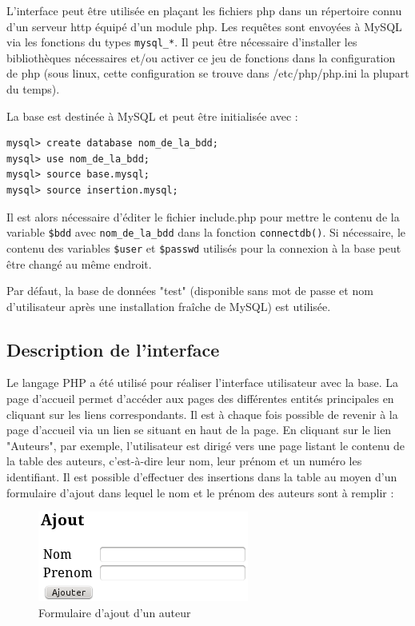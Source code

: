 \documentclass[12pt]{article}
\begin{document}
L'interface peut être utilisée en plaçant les fichiers php dans un répertoire
connu d'un serveur http équipé d'un module php. Les requêtes sont envoyées à
MySQL via les fonctions du types \verb!mysql_*!. Il peut être nécessaire
d'installer les bibliothèques nécessaires et/ou activer ce jeu de fonctions
dans la configuration de php (sous linux, cette configuration se trouve dans
/etc/php/php.ini la plupart du temps).

La base est destinée à MySQL et peut être initialisée avec :
\begin{verbatim}
mysql> create database nom_de_la_bdd;
mysql> use nom_de_la_bdd;
mysql> source base.mysql;
mysql> source insertion.mysql;
\end{verbatim}

Il est alors nécessaire d'éditer le fichier include.php pour mettre le contenu
de la variable \verb!$bdd! avec \verb!nom_de_la_bdd! dans la fonction
\verb!connectdb()!. Si nécessaire, le contenu des variables \verb!$user! et
\verb!$passwd! utilisés pour la connexion à la base peut être changé au même
endroit.

Par défaut, la base de données "test" (disponible sans mot de passe et nom
d'utilisateur après une installation fraîche de MySQL) est utilisée.


\subsection{Description de l'interface}

Le langage PHP a été utilisé pour réaliser l'interface utilisateur avec la
base. La page d'accueil permet d'accéder aux pages des différentes entités
principales en cliquant sur les liens correspondants. Il est à chaque fois
possible de revenir à la page d'accueil via un lien se situant en haut de la
page. En cliquant sur le lien "Auteurs", par exemple, l'utilisateur est dirigé
vers une page listant le contenu de la table des auteurs, c'est-à-dire leur
nom, leur prénom et un numéro les identifiant. Il est possible d'effectuer des
insertions dans la table au moyen d'un formulaire d'ajout dans lequel le nom
et le prénom des auteurs sont à remplir :

\begin{figure}[h!]
\begin{center}
\noindent\includegraphics[]{formulaire-ajout-auteur}
  \caption{Formulaire d'ajout d'un auteur}
\end{center}
\end{figure}
\end{document}
